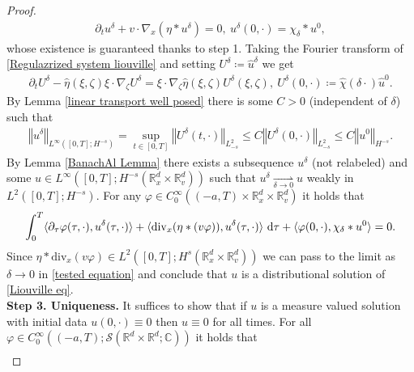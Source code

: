 \documentclass[11pt,reqno]{amsart}
\numberwithin{equation}{section}
\def\dd{{\rm d}}
\begin{document}
\begin{proof}
\begin{align}
\partial_{t}u^{\delta}+v\cdot\nabla_{x}(\eta\ast u^{\delta})=0, \ u^{\delta}(0,\cdot)=\chi_{\delta}\ast u^{0},\label{Regulazrized system liouville}    
\end{align}
whose existence is guaranteed thanks to step 1. Taking the Fourier transform of \eqref{Regulazrized system liouville} and setting $U^{\delta}\coloneqq \widehat{u}^{\delta}$ we get 
\begin{align*}
\partial_{t}U^{\delta}-\widehat{\eta}(\xi,\zeta)\xi\cdot \nabla_{\zeta}U^{\delta}=\xi\cdot \nabla_{\zeta}\widehat{\eta}(\xi,\zeta)U^{\delta}(\xi,\zeta), \ U^{\delta}(0,\cdot)\coloneqq   \widehat{\chi}(\delta\cdot )\widehat{u}^{0}.    
\end{align*}
By Lemma \ref{linear transport well posed} there is some $C>0$ (independent of $\delta$) such that 
\begin{align*}
\left\Vert u^{\delta}\right\Vert_{L^{\infty}([0,T];H^{-s})} =\underset{t\in [0,T]}{\sup}\left\Vert U^{\delta}(t,\cdot)\right\Vert_{L^{2}_{-s}
}\leq C\left\Vert U^{\delta}(0,\cdot)\right\Vert_{L^{2}_{-s}}\leq C\left\Vert u^{0}\right\Vert_{H^{-s}}.   
\end{align*}
By Lemma \ref{BanachAl Lemma} there exists a subsequence $u^{\delta}$ (not relabeled) and some $u\in L^{\infty}([0,T];H^{-s}(\mathbb{R}^{d}_{x}\times \mathbb{R}^{d}_{v}))$ such that $u^{\delta}\underset{\delta \rightarrow 0}{\rightharpoonup}u$ weakly in $L^{2}([0,T];H^{-s})$. For any $\varphi \in C^{\infty}_{0}((-a,T)\times \mathbb{R}^{d}_{x}\times \mathbb{R}^{d}_{v})$ it holds that  
\begin{align}
\int_{0}^{T}\langle \partial_{\tau}\varphi(\tau,\cdot),u^{\delta}(\tau,\cdot)\rangle+\langle \mathrm{div}_{x}(\eta\ast (v\varphi)),u^{\delta}(\tau,\cdot)\rangle \ \dd \tau+\langle \varphi(0,\cdot),\chi_{\delta}\ast u^{0}\rangle=0.     
\label{tested equation}
\end{align}
Since $\eta\ast \mathrm{div}_{x}(v\varphi)\in L^{2}([0,T];H^{s}(\mathbb{R}^{d}_{x}\times \mathbb{R}^{d}_{v}))$ we can pass to the limit as $\delta \rightarrow 0$ in \eqref{tested equation}  
and conclude that $u$ is a distributional solution of \eqref{Liouville eq}.\\ 
\textbf{Step 3. Uniqueness.} 
It suffices to show that if  
$u$ is a measure valued solution with initial data $u(0,\cdot)\equiv0$ then $u\equiv 0$ for all times.  For all $\varphi\in C^{\infty}_{0}((-a,T);\mathcal{S}(\mathbb{R}^{d}\times \mathbb{R}^{d};\mathbb{C}))$ it holds that 
\begin{align*}

\end{align*}
\end{proof}
\end{document}
